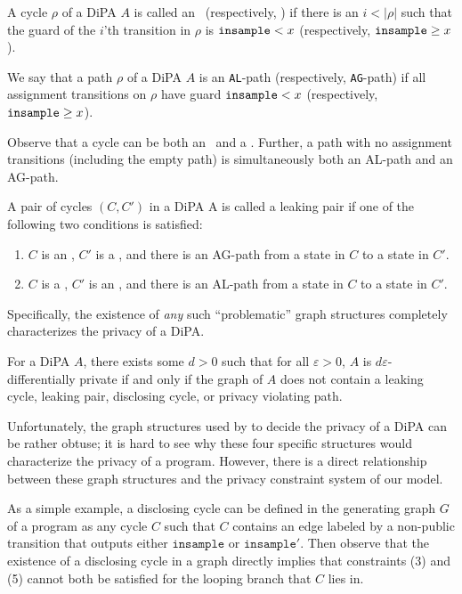 \begin{defn}
    A cycle $\rho$ of a DiPA $A$ is called an \lcycle~(respectively, \gcycle) if there is an $i< |\rho|$ such that the guard of the $i$'th transition in $\rho$ is $\texttt{insample} < x$ (respectively, $\texttt{insample}\geq x$).

    We say that a path $\rho$ of a DiPA $A$ is an \texttt{AL}-path (respectively, \texttt{AG}-path) if all assignment transitions on $\rho$ have guard $\texttt{insample} < x$ (respectively, $\texttt{insample}\geq x$).

    Observe that a cycle can be both an \lcycle~and a \gcycle.
    Further, a path with no assignment transitions (including the empty path) is simultaneously both an AL-path and an AG-path.
\end{defn} 
\begin{defn}\label{defLeakingPairs}
    A pair of cycles $(C, C')$ in a DiPA A is called a leaking pair if one of the following two conditions is satisfied:
    \begin{enumerate}
        \item $C$ is an \lcycle, $C'$ is a \gcycle, and there is an AG-path
        from a state in $C$ to a state in $C'$.
        \item $C$ is a \gcycle, $C'$ is an \lcycle, and there is an AL-path
        from a state in $C$ to a state in $C'$.
    \end{enumerate}
\end{defn} 

Specifically, the existence of \textit{any} such ``problematic'' graph structures completely characterizes the privacy of a DiPA. 

\begin{thm}\label{DiPACounterexamplesThm}
    For a DiPA $A$, there exists some $d>0$ such that for all $\varepsilon>0$, $A$ is $d\varepsilon$-differentially private if and only if the graph of $A$ does not contain a leaking cycle, leaking pair, disclosing cycle, or privacy violating path.
\end{thm}

Unfortunately, the graph structures used by \cite{chadhaLinearTimeDecidability2021} to decide the privacy of a DiPA can be rather obtuse; it is hard to see why these four specific structures would characterize the privacy of a program. However, there is a direct relationship between these graph structures and the privacy constraint system of our model. 

As a simple example, a disclosing cycle can be defined in the generating graph $G$ of a program as any cycle $C$ such that $C$ contains an edge labeled by a non-public transition that outputs either $\texttt{insample}$ or $\texttt{insample}'$. 
Then observe that the existence of a disclosing cycle in a graph directly implies that constraints (3) and (5) cannot both be satisfied for the looping branch that $C$ lies in.


